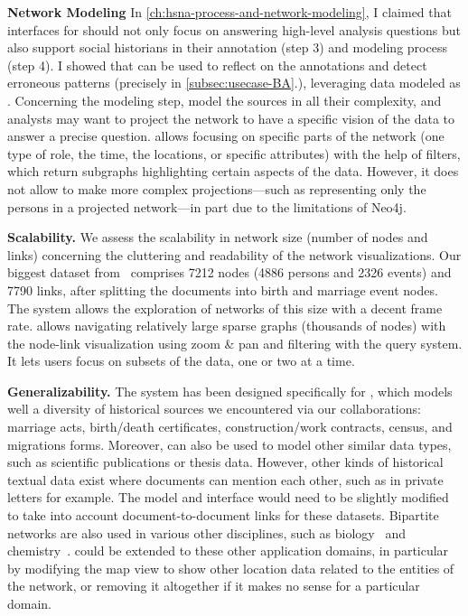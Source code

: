 \noindent\textbf{Network Modeling}
In \autoref{ch:hsna-process-and-network-modeling}, I claimed that \va interfaces for \hsna should not only focus on answering high-level analysis questions but also support social historians in their annotation (step 3) and modeling process (step 4).
I showed that \combinet can be used to reflect on the annotations and detect erroneous patterns (precisely in \autoref{subsec:usecase-BA}.), leveraging data modeled as \modelplural.
Concerning the modeling step, \modelplural model the sources in all their complexity, and analysts may want to project the network to have a specific vision of the data to answer a precise question.
\combinet allows focusing on specific parts of the network (one type of role, the time, the locations, or specific attributes) with the help of filters, which return subgraphs highlighting certain aspects of the data.
However, it does not allow to make more complex projections---such as representing only the persons in a projected network---in part due to the limitations of Neo4j\cite{neo4j}.

\noindent\textbf{Scalability.} We assess the scalability in network size (number of nodes and links) concerning the cluttering and readability of the network visualizations. Our biggest dataset from \zacarias\ comprises 7212 nodes (4886 persons and 2326 events) and 7790 links, after splitting the documents into birth and marriage event nodes. The system allows the exploration of networks of this size with a decent frame rate.
\name allows navigating relatively large sparse graphs (thousands of nodes) with the node-link visualization using zoom \& pan and filtering with the query system. It lets users focus on subsets of the data, one or two at a time.

\noindent\textbf{Generalizability.} The system has been designed specifically for \modelplural, which models well a diversity of historical sources we encountered via our collaborations: marriage acts, birth/death certificates, construction/work contracts, census, and migrations forms.
Moreover, \model can also be used to model other similar data types, such as scientific publications or thesis data.
However, other kinds of historical textual data exist where documents can mention each other, such as in private letters for example.
The model and interface would need to be slightly modified to take into account document-to-document links for these datasets.
Bipartite networks are also used in various other disciplines, such as biology~\cite{klamt2009hypergraphs} and chemistry~\cite{konstantinovaApplicationHypergraphTheory2001}. \name could be extended to these other application domains, in particular by modifying the map view to show other location data related to the entities of the network, or removing it altogether if it makes no sense for a particular domain.

